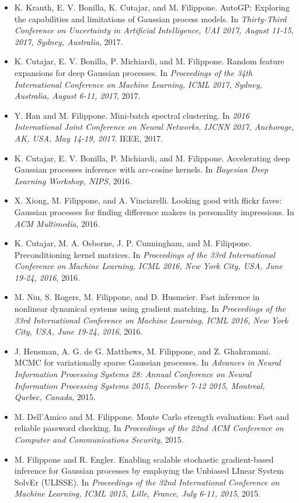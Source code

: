 \begin{itemize}
\item  K. Krauth, E. V. Bonilla, K. Cutajar, and M. Filippone. AutoGP: Exploring the capabilities and limitations of Gaussian process models. In \emph{Thirty-Third Conference on Uncertainty in Artificial Intelligence, UAI 2017, August 11-15, 2017, Sydney, Australia}, 2017.  
\item  K. Cutajar, E. V. Bonilla, P. Michiardi, and M. Filippone. Random feature expansions for deep Gaussian processes. In \emph{Proceedings of the 34th International Conference on Machine Learning, ICML 2017, Sydney, Australia, August 6-11, 2017}, 2017.  
\item  Y. Han and M. Filippone. Mini-batch spectral clustering. In \emph{2016 International Joint Conference on Neural Networks, IJCNN 2017, Anchorage, AK, USA, May 14-19, 2017}. IEEE, 2017.  
\item  K. Cutajar, E. V. Bonilla, P. Michiardi, and M. Filippone. Accelerating deep Gaussian processes inference with arc-cosine kernels. In \emph{Bayesian Deep Learning Workshop, NIPS}, 2016.  
\item  X. Xiong, M. Filippone, and A. Vinciarelli. Looking good with flickr faves: Gaussian processes for finding difference makers in personality impressions. In \emph{ACM Multimedia}, 2016.  
\item  K. Cutajar, M. A. Osborne, J. P. Cunningham, and M. Filippone. Preconditioning kernel matrices. In \emph{Proceedings of the 33rd International Conference on Machine Learning, ICML 2016, New York City, USA, June 19-24, 2016}, 2016.  
\item  M. Niu, S. Rogers, M. Filippone, and D. Husmeier. Fast inference in nonlinear dynamical systems using gradient matching. In \emph{Proceedings of the 33rd International Conference on Machine Learning, ICML 2016, New York City, USA, June 19-24, 2016}, 2016.  
\item  J. Hensman, A. G. de G. Matthews, M. Filippone, and Z. Ghahramani. MCMC for variationally sparse Gaussian processes. In \emph{Advances in Neural Information Processing Systems 28: Annual Conference on Neural Information Processing Systems 2015, December 7-12 2015, Montreal, Quebec, Canada}, 2015.  
\item  M. Dell'Amico and M. Filippone. Monte Carlo strength evaluation: Fast and reliable password checking. In \emph{Proceedings of the 22nd ACM Conference on Computer and Communications Security}, 2015.  
\item  M. Filippone and R. Engler. Enabling scalable stochastic gradient-based inference for Gaussian processes by employing the Unbiased LInear System SolvEr (ULISSE). In \emph{Proceedings of the 32nd International Conference on Machine Learning, ICML 2015, Lille, France, July 6-11, 2015}, 2015.  

\end{itemize}

